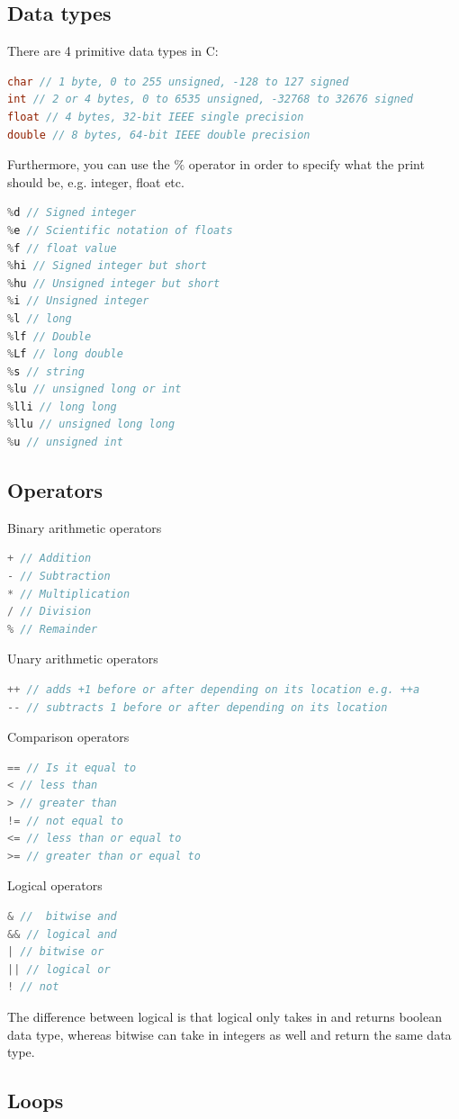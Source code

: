 \documentclass[a4paper]{article}
\theoremstyle{plain}
\theoremstyle{definition}
\theoremstyle{remark}
\begin{document}
\subsection{Data types}
There are 4 primitive data types in C:
\begin{lstlisting}[language = C]
char // 1 byte, 0 to 255 unsigned, -128 to 127 signed
int // 2 or 4 bytes, 0 to 6535 unsigned, -32768 to 32676 signed
float // 4 bytes, 32-bit IEEE single precision
double // 8 bytes, 64-bit IEEE double precision
\end{lstlisting}
Furthermore, you can use the $\%$ operator in order to specify what the print should be, e.g. integer, float etc.
\begin{lstlisting}[language = C]
%c // Character
%d // Signed integer
%e // Scientific notation of floats
%f // float value
%hi // Signed integer but short
%hu // Unsigned integer but short
%i // Unsigned integer
%l // long
%lf // Double
%Lf // long double
%s // string
%lu // unsigned long or int
%lli // long long
%llu // unsigned long long
%u // unsigned int
\end{lstlisting}

\subsection{Operators}
Binary arithmetic operators
\begin{lstlisting}[language = C]
+ // Addition
- // Subtraction
* // Multiplication
/ // Division
% // Remainder
\end{lstlisting}
Unary arithmetic operators
\begin{lstlisting}[language = C]
++ // adds +1 before or after depending on its location e.g. ++a
-- // subtracts 1 before or after depending on its location
\end{lstlisting}
Comparison operators
\begin{lstlisting}[language = C]
== // Is it equal to
< // less than
> // greater than
!= // not equal to
<= // less than or equal to
>= // greater than or equal to
\end{lstlisting}
Logical operators
\begin{lstlisting}[language = C]
& //  bitwise and
&& // logical and
| // bitwise or
|| // logical or
! // not
\end{lstlisting}
The difference between logical is that logical only takes in and returns boolean data type, whereas bitwise can take in integers as well and return the same data type.
\subsection{Loops}
\end{document}
